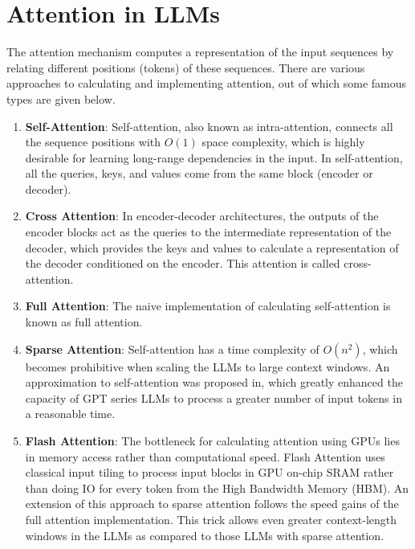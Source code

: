 \documentclass[a4paper,oneside]{book}
\begin{document}
\section{Attention in LLMs}
The attention mechanism computes a representation of the input sequences by relating different positions (tokens) of these sequences. There are various approaches to calculating and implementing attention, out of which some famous types are given below.

\begin{enumerate}
    \item \textbf{Self-Attention}: Self-attention, also known as intra-attention, connects all the sequence positions with $O(1)$ space complexity, which is highly desirable for learning long-range dependencies in the input. In self-attention, all the queries, keys, and values come from the same block (encoder or decoder).

    \item \textbf{Cross Attention}: In encoder-decoder architectures, the outputs of the encoder blocks act as the queries to the intermediate representation of the decoder, which provides the keys and values to calculate a representation of the decoder conditioned on the encoder. This attention is called cross-attention.

    \item \textbf{Full Attention}: The naive implementation of calculating self-attention is known as full attention.

    \item \textbf{Sparse Attention}: Self-attention has a time complexity of $O(n^2)$, which becomes prohibitive when scaling the LLMs to large context windows. An approximation to self-attention was proposed in, which greatly enhanced the capacity of GPT series LLMs to process a greater number of input tokens in a reasonable time.

    \item \textbf{Flash Attention}: The bottleneck for calculating attention using GPUs lies in memory access rather than computational speed. Flash Attention uses classical input tiling to process input blocks in GPU on-chip SRAM rather than doing IO for every token from the High Bandwidth Memory (HBM). An extension of this approach to sparse attention follows the speed gains of the full attention implementation. This trick allows even greater context-length windows in the LLMs as compared to those LLMs with sparse attention.
\end{enumerate}
\end{document}
